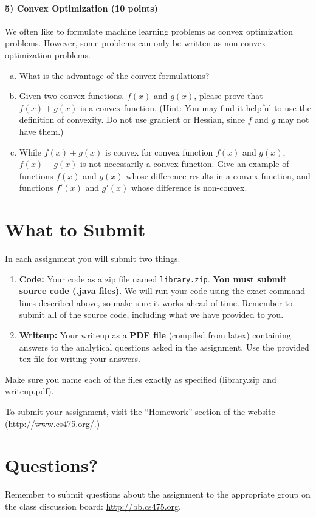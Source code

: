 \documentclass[11pt]{article}
\begin{document}
\paragraph{5) Convex Optimization (10 points)}
We often like to formulate machine learning problems as convex optimization problems. However, some problems can only be written as non-convex optimization problems.
\begin{enumerate}[(a)]
\item What is the advantage of the convex formulations?
\item Given two convex functions.  $f(x)$ and $g(x)$, please prove that $f(x)+g(x)$ is a convex function. (Hint: You may find it helpful to use the definition of convexity. Do not use gradient or Hessian, since $f$ and $g$ may not have them.)
\item While $f(x)+g(x)$ is convex for convex function $f(x)$ and $g(x)$, $f(x)-g(x)$ is not necessarily a convex function. Give an example of functions $f(x)$ and $g(x)$ whose difference results in a convex function, and functions $f'(x)$ and $g'(x)$ whose difference is non-convex.
\end{enumerate}



\section{What to Submit}
In each assignment you will submit two things.
\begin{enumerate}
\item {\bf Code:} Your code as a zip file named {\tt library.zip}. {\bf You must submit source code (.java files)}. We will run your code using the exact command lines described above, so make sure it works ahead of time. Remember to submit all of the source code, including what we have provided to you.
\item {\bf Writeup:} Your writeup as a {\bf PDF file} (compiled from latex) containing answers to the analytical questions asked in the assignment. Use the provided tex file for writing your answers.
\end{enumerate}
Make sure you name each of the files exactly as specified (library.zip and writeup.pdf).

To submit your assignment, visit the ``Homework'' section of the website (\href{http://www.cs475.org/}{http://www.cs475.org/}.)

\section{Questions?}
Remember to submit questions about the assignment to the appropriate group on the class discussion board: \href{http://bb.cs475.org/}{http://bb.cs475.org}.
\end{document}
